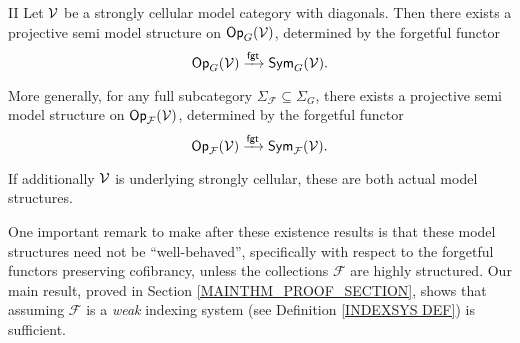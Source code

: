 \documentclass[a4paper,10pt]{article}%
\begin{document}
\begin{customthm}{II}\label{MAINEXIST2 THM}
Let $\mathcal V$ be a strongly cellular model category with diagonals.
Then there exists a projective semi model structure on $\mathsf{Op}_{G}(\mathcal V)$, determined by the forgetful functor
\[
\mathsf{Op}_G(\mathcal V) \xrightarrow{\mathsf{fgt}} \mathsf{Sym}_G(\mathcal V).
\]

More generally, for any full subcategory $\Sigma_{\mathcal F} \subseteq \Sigma_G$, 
there exists a projective semi model structure on $\mathsf{Op}_{\mathcal F}(\mathcal V)$, determined by the forgetful functor
\[
\mathsf{Op}_{\mathcal F}(\mathcal V) \xrightarrow{\mathsf{fgt}} \mathsf{Sym}_{\mathcal F}(\mathcal V).
\]




If additionally $\mathcal V$ is underlying strongly cellular, these are both actual model structures.
\end{customthm}

One important remark to make after these 
existence results is that these model structures need not be ``well-behaved'', 
specifically with respect to the forgetful functors preserving cofibrancy, 
unless the collections ${\mathcal F}$ are highly structured.
Our main result, proved in Section \ref{MAINTHM_PROOF_SECTION}, shows that assuming $\mathcal F$ is a \textit{weak} indexing system (see Definition \ref{INDEXSYS DEF}) is sufficient.
\end{document}

